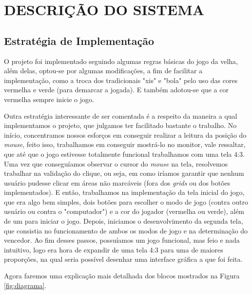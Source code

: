 \section{DESCRIÇÃO DO SISTEMA}

\subsection{Estratégia de Implementação}
O projeto foi implementado seguindo algumas regras básicas do jogo da velha\cite{ref:velha-regras}, além delas, optou-se por algumas modificações, a fim de facilitar a implementação, como a troca dos tradicionais "xis" e "bola" pelo uso das cores vermelha e verde (para demarcar a jogada). E também adotou-se que a cor vermelha sempre inicie o jogo.

Outra estratégia interessante de ser comentada é a respeito da maneira a qual implementamos o projeto, que julgamos ter facilitado bastante o trabalho. No início, concentramos nossos esforços em conseguir realizar a leitura da posição do \emph{mouse}, feito isso, trabalhamos em conseguir mostrá-lo no monitor, vale ressaltar, que até que o jogo estivesse totalmente funcional trabalhamos com uma tela 4:3. Uma vez que conseguíamos observar o cursor do \emph{mouse} na tela, resolvemos trabalhar na validação do clique, ou seja, em como iríamos garantir que nenhum usuário pudesse clicar em áreas não marcáveis (fora dos \emph{grids} ou dos botões implementados). E então, trabalhamos na implementação da tela inicial do jogo, que era algo bem simples, dois botões para escolher o modo de jogo (contra outro usuário ou contra o "computador") e a cor do jogador (vermelha ou verde), além de um para iniciar o jogo. Depois, iniciamos o desenvolvimento da segunda tela, que consistia no funcionamento de ambos os modos de jogo e na determinação do vencedor. Ao fim desses passos, possuíamos um jogo funcional, mas feio e nada intuitivo, logo era hora de expandir de uma tela 4:3 para uma de maiores proporções, na qual seria possível desenhar uma interface gráfica a que foi feita.

Agora faremos uma explicação mais detalhada dos blocos mostrados na Figura \ref{fig:diagrama}.


